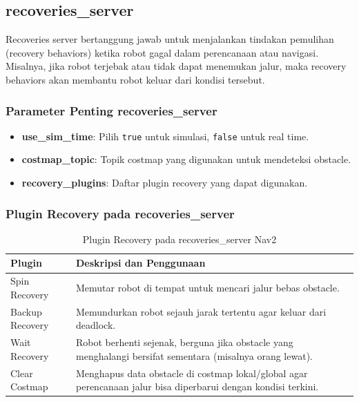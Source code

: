 \documentclass{article}
\begin{document}
\subsection{recoveries\_server}
Recoveries server bertanggung jawab untuk menjalankan tindakan pemulihan (recovery behaviors) ketika robot gagal dalam perencanaan atau navigasi. Misalnya, jika robot terjebak atau tidak dapat menemukan jalur, maka recovery behaviors akan membantu robot keluar dari kondisi tersebut.

\subsubsection*{Parameter Penting recoveries\_server}
\begin{itemize}
  \item \textbf{use\_sim\_time}: Pilih \texttt{true} untuk simulasi, \texttt{false} untuk real time.
  \item \textbf{costmap\_topic}: Topik costmap yang digunakan untuk mendeteksi obstacle.
  \item \textbf{recovery\_plugins}: Daftar plugin recovery yang dapat digunakan.
\end{itemize}

\subsubsection*{Plugin Recovery pada recoveries\_server}
\begin{table}[H]
  \centering
  \renewcommand{\arraystretch}{1.2}
  \begin{tabular}{|p{3cm}|p{8cm}|}
    \hline
    \textbf{Plugin} & \textbf{Deskripsi dan Penggunaan}                                                                              \\
    \hline
    Spin Recovery   & Memutar robot di tempat untuk mencari jalur bebas obstacle.                                                    \\
    \hline
    Backup Recovery & Memundurkan robot sejauh jarak tertentu agar keluar dari deadlock.                                             \\
    \hline
    Wait Recovery   & Robot berhenti sejenak, berguna jika obstacle yang menghalangi bersifat sementara (misalnya orang lewat).      \\
    \hline
    Clear Costmap   & Menghapus data obstacle di costmap lokal/global agar perencanaan jalur bisa diperbarui dengan kondisi terkini. \\
    \hline
  \end{tabular}
  \caption{Plugin Recovery pada recoveries\_server Nav2}
\end{table}
\end{document}
